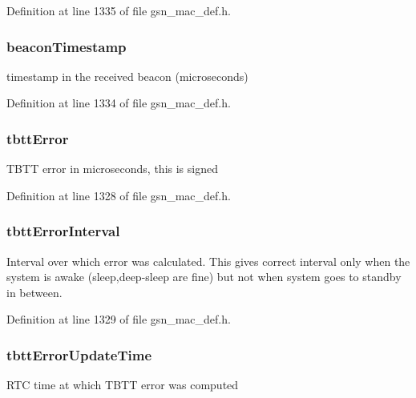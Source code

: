 Definition at line 1335 of file gsn\_\-mac\_\-def.h.

\hypertarget{a00134_a9363de710e6e10227bd2cba50db103f1}{
\subsubsection[{beaconTimestamp}]{ {\bf beaconTimestamp}}}
\label{a00134_a9363de710e6e10227bd2cba50db103f1}
timestamp in the received beacon (microseconds) 

Definition at line 1334 of file gsn\_\-mac\_\-def.h.

\hypertarget{a00134_a3d1414bdcc8e606c7ce01b0ae1ecd3f5}{
\subsubsection[{tbttError}]{ {\bf tbttError}}}
\label{a00134_a3d1414bdcc8e606c7ce01b0ae1ecd3f5}
TBTT error in microseconds, this is signed 

Definition at line 1328 of file gsn\_\-mac\_\-def.h.

\hypertarget{a00134_a6ee6d5e38a858420f2c05255880cd74b}{
\subsubsection[{tbttErrorInterval}]{ {\bf tbttErrorInterval}}}
\label{a00134_a6ee6d5e38a858420f2c05255880cd74b}
Interval over which error was calculated. This gives correct interval only when the system is awake (sleep,deep-\/sleep are fine) but not when system goes to standby in between. 

Definition at line 1329 of file gsn\_\-mac\_\-def.h.

\hypertarget{a00134_a179f80a8972ebcf158d1107182fd1ca3}{
\subsubsection[{tbttErrorUpdateTime}]{ {\bf tbttErrorUpdateTime}}}
\label{a00134_a179f80a8972ebcf158d1107182fd1ca3}
RTC time at which TBTT error was computed 

